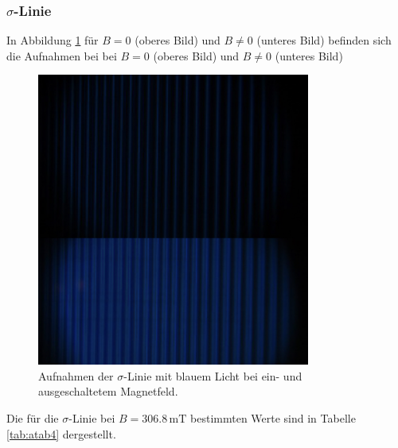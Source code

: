 \subsubsection*{$\sigma$-Linie}
In Abbildung \ref{fig:afig4} für $B = 0$ (oberes Bild) und $B \neq 0$ (unteres Bild) befinden sich die Aufnahmen bei
bei $B = 0$ (oberes Bild) und $B \neq 0$ (unteres Bild)
\FloatBarrier
\begin{figure}
    \centering
    \includegraphics[width=0.8\textwidth]{sigma.jpg}
    \caption{Aufnahmen der $\sigma$-Linie mit blauem Licht bei ein- und ausgeschaltetem Magnetfeld.}
    \label{fig:afig4}
\end{figure}
\FloatBarrier
Die für die $\sigma$-Linie bei $B = 306.8 \, \si{\milli\tesla}$ bestimmten Werte sind in Tabelle \ref{tab:atab4} dergestellt.
\FloatBarrier
